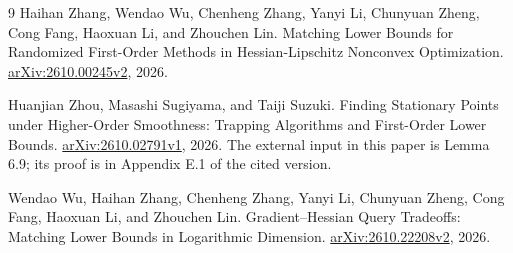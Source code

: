 \documentclass[11pt]{article}
\theoremstyle{definition}
\theoremstyle{remark}
\begin{document}
\begin{thebibliography}{9}
Haihan Zhang, Wendao Wu, Chenheng Zhang, Yanyi Li, Chunyuan Zheng,
Cong Fang, Haoxuan Li, and Zhouchen Lin.
\newblock Matching Lower Bounds for Randomized First-Order Methods in
Hessian-Lipschitz Nonconvex Optimization.
\newblock \href{https://arxiv.org/abs/2610.00245v2}{arXiv:2610.00245v2}, 2026.

Huanjian Zhou, Masashi Sugiyama, and Taiji Suzuki.
\newblock Finding Stationary Points under Higher-Order Smoothness:
Trapping Algorithms and First-Order Lower Bounds.
\newblock \href{https://arxiv.org/abs/2610.02791v1}{arXiv:2610.02791v1}, 2026.
\newblock The external input in this paper is Lemma 6.9; its proof is in
Appendix E.1 of the cited version.

Wendao Wu, Haihan Zhang, Chenheng Zhang, Yanyi Li, Chunyuan Zheng,
Cong Fang, Haoxuan Li, and Zhouchen Lin.
\newblock Gradient--Hessian Query Tradeoffs:
Matching Lower Bounds in Logarithmic Dimension.
\newblock \href{https://arxiv.org/abs/2610.22208v2}{arXiv:2610.22208v2}, 2026.

\end{thebibliography}
\endgroup
\end{document}

